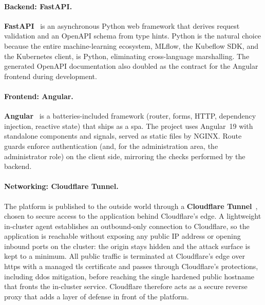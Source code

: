 
\paragraph{Backend: FastAPI.}
\textbf{FastAPI}~\cite{fastapi_docs} is an asynchronous Python web framework that
derives request validation and an OpenAPI schema from type hints. Python is the
natural choice because the entire machine-learning ecosystem, MLflow, the Kubeflow
SDK, and the Kubernetes client, is Python, eliminating cross-language
marshalling. The generated OpenAPI documentation also doubled as the contract for
the Angular frontend during development.


\paragraph{Frontend: Angular.}
\textbf{Angular}~\cite{angular_docs} is a batteries-included framework (router,
forms, HTTP, dependency injection, reactive state) that ships as a \gls{spa}. The
project uses Angular~19 with standalone components and signals, served as static
files by NGINX. Route guards enforce authentication (and, for the administration
area, the administrator role) on the client side, mirroring the checks performed
by the backend.


\paragraph{Networking: Cloudflare Tunnel.}
The platform is published to the outside world through a \textbf{Cloudflare
Tunnel}~\cite{cloudflare_tunnel}, chosen to secure access to the application
behind Cloudflare's edge. A lightweight in-cluster agent establishes an
outbound-only connection to Cloudflare, so the application is reachable without
exposing any public IP address or opening inbound ports on the cluster: the
origin stays hidden and the attack surface is kept to a minimum. All public
traffic is terminated at Cloudflare's edge over \gls{https} with a managed
\gls{tls} certificate and passes through Cloudflare's protections, including
\gls{ddos} mitigation, before reaching the single hardened public hostname that
fronts the in-cluster service. Cloudflare therefore acts as a secure reverse
proxy that adds a layer of defense in front of the platform.

